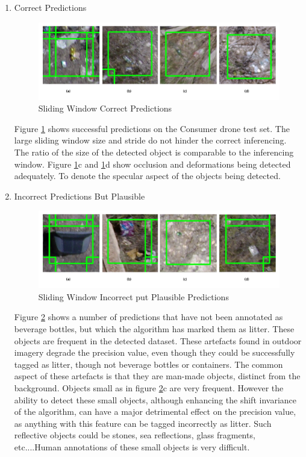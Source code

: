 \documentclass{IEEEtran}
\begin{document}
\begin{enumerate}
\item Correct Predictions
\begin{figure}[H]
\centering
\includegraphics[scale=0.4]{images/test1-correct.png}
\caption{Sliding Window Correct Predictions}
\label{fig:test1correct}
\end{figure}

Figure \ref{fig:test1correct} shows successful predictions on the Consumer drone test set. The large sliding window size and stride do not hinder the correct inferencing. The ratio of the size of the detected object is comparable to the inferencing window. Figure \ref{fig:test1correct}c and \ref{fig:test1correct}d show occlusion and deformations being detected adequately. To denote the specular aspect of the objects being detected.

\item Incorrect Predictions But Plausible
\begin{figure}[H]
\centering
\includegraphics[scale=0.4]{images/test1-plausible.png}
\caption{Sliding Window Incorrect put Plausible Predictions}
\label{fig:test1plausible}
\end{figure}

Figure \ref{fig:test1plausible} shows a number of predictions that have not been annotated as beverage bottles, but which the algorithm has marked them as litter. These objects are frequent in the detected dataset. These artefacts found in outdoor imagery degrade the precision value, even though they could be successfully tagged as litter, though not beverage bottles or containers. The common aspect of these artefacts is that they are man-made objects, distinct from the background. Objects small as in figure \ref{fig:test1plausible}c are very frequent. However the ability to detect these small objects, although enhancing the shift invariance of the algorithm, can have a major detrimental effect on the precision value, as anything with this feature can be tagged incorrectly as litter. Such reflective objects could be stones, sea reflections, glass fragments, etc....Human annotations of these small objects is very difficult.


\end{enumerate}
\end{document}
